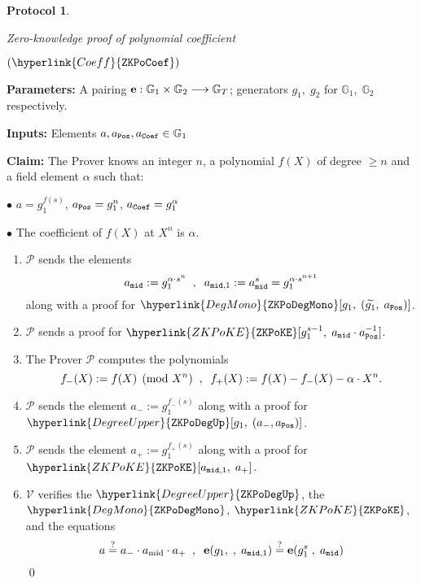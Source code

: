 \documentclass[11pt, lettersize, notitlepage, leqno, footskip=0.6cm]{article}
\newcommand{\lra}{\longrightarrow}
\newcommand{\wti}{\widetilde}
\newcommand{\mc}{\mathcal}
\newcommand{\mb}{\mathbb}
\newcommand{\mbf}{\mathbf}
\newcommand{\mr}{\mathrm}
\newcommand{\al}{\alpha}
\newcommand{\mP}{\mc{P}}
\newcommand{\V}{\mc{V}}
\newcommand{\vs}{\vspace{-0.15cm}}
\newcommand{\noin}{\noindent}
\newcommand{\sta}{\stackrel{?}{=}}
\newcommand{\e}{\mbf{e}}
\newtheorem{Prot}[Thm]{Protocol}
\numberwithin{equation}{section}
\begin{document}
\begin{mdframed}
\begin{Prot} \hypertarget{Coeff}{Zero-knowledge proof of polynomial coefficient} $(\hyperlink{Coeff}{\tt{ZKPoCoef}})$\end{Prot}  

\noindent \textbf{Parameters:} A pairing ${\bf{e}}:\mb{G}_1\times \mb{G}_2\lra \mb{G}_T$; generators $g_1,\;g_2$ for $\mb{G}_1,\; \mb{G}_2$ respectively.


\noindent \textbf{Inputs:} Elements $a, a_{\tt{Pos}}, a_{\tt{Coef}} \in \mb{G}_1$

\noindent \textbf{Claim:} The Prover knows an integer $n$, a polynomial $f(X)$ of degree $\geq n$ and a field element $\al$ such that: \vspace{2mm}

\noin $\bullet$ $a = g_1^{f(s)}$, $a_{\tt{Pos}} = g_1^n$, $a_{\tt{Coef}} = g_1^{\al}$ \vspace{1mm}

\noin $\bullet$ The coefficient of $f(X)$ at $X^n$ is $\al$.


\begin{enumerate}[wide, labelwidth=!, labelindent=0pt, itemsep=-0.2ex] 

\item $\mP$ sends the elements \vs $$a_{\tt{mid}}:= g_1^{\al\cdot s^n}\;\;,\;\;a_{{\tt{mid}},1}:= a_{\tt{mid}}^s = g_1^{\al\cdot s^{n+1}}  $$ along with a proof for $\hyperlink{DegMono}{\tt{ZKPoDegMono}}[g_1,\;(\wti{g_1},\; a_{\tt{Pos}})]$.

\item $\mP$ sends a proof for $\hyperlink{ZKPoKE}{\tt{ZKPoKE}}[g_1^{s-1},\; a_{\tt{mid}}\cdot a_{\tt{Pos}}^{-1}]$.

\item The Prover $\mP$ computes the polynomials \vs $$f_{-}(X):= f(X)\pmod{X^n}\;\;,\;\;f_{+}(X):= {f(X)-f_{-}(X) - \al\cdot X^n}. \vs $$ 

\item $\mP$ sends the element $a_{-}:= g_1^{f_{-}(s)}$ along with a proof for $\hyperlink{DegreeUpper}{\tt{ZKPoDegUp}}[g_1,\;(a_{-}, a_{\tt{Pos}})]$.

\item $\mP$ sends the element $a_{+}:= g_1^{f_{+}(s)}$ along with a proof for $\hyperlink{ZKPoKE}{\tt{ZKPoKE}}[a_{{\tt{mid}},1},\; a_{+}]$. 



\item $\V$ verifies the $\hyperlink{DegreeUpper}{\tt{ZKPoDegUp}}$, the $\hyperlink{DegMono}{\tt{ZKPoDegMono}}$, $\hyperlink{ZKPoKE}{\tt{ZKPoKE}}$, 
and the equations \vs $$ a\sta a_{-}\cdot a_{\mr{mid}}\cdot a_{+}\;\;,\;\;\e(g_1,\;,\;a_{{\tt{mid}},1})\sta \e(g_1^{s}\;,\;a_{\tt{mid}}) \vspace{-7mm}  $$ \qed \end{enumerate} 
\end{mdframed}
\end{document}

